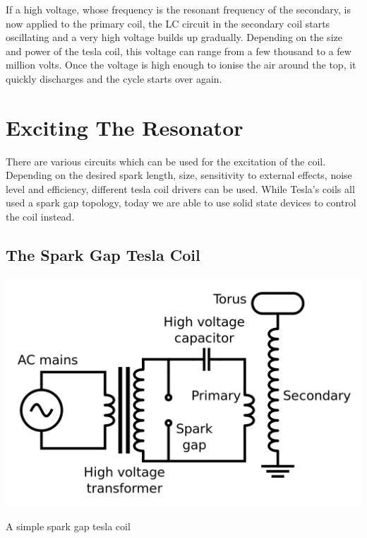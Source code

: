 If a high voltage, whose frequency is the resonant frequency of the secondary, is now applied to the primary coil, the LC circuit in the secondary coil starts oscillating and a very high voltage builds up gradually. Depending on the size and power of the tesla coil, this voltage can range from a few thousand to a few million volts. Once the voltage is high enough to ionise the air around the top, it quickly discharges and the cycle starts over again.

\section{Exciting The Resonator}

There are various circuits which can be used for the excitation of the coil. Depending on the desired spark length, size, sensitivity to external effects, noise level and efficiency, different tesla coil drivers can be used. While Tesla's coils all used a spark gap topology, today we are able to use solid state devices to control the coil instead.

\subsection{The Spark Gap Tesla Coil}

\begin{marginfigure}
\includegraphics[width=\textwidth]{simon/images/sparkGapTeslaCoil.png}
\caption{A simple spark gap tesla coil}
\end{marginfigure}

